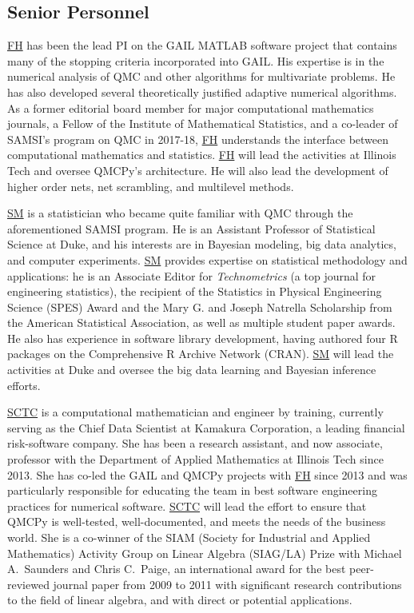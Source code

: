\documentclass[11pt]{NSFamsart}
\newcommand{\FH}{\hyperlink{FHlink}{FH}\xspace}
\newcommand{\SM}{\hyperlink{SMlink}{SM}\xspace}
\newcommand{\SCTC}{\hyperlink{SCTClink}{SCTC}\xspace}
\begin{document}
\subsection{Senior Personnel}
\FH has been the lead PI on the GAIL \cite{ChoEtal20a} MATLAB software project that contains many of the stopping criteria incorporated into GAIL.  His expertise is in the numerical analysis of QMC and other algorithms for multivariate problems.  He has also developed several theoretically justified adaptive numerical algorithms.  As a former editorial board member for major computational mathematics journals, a Fellow of the Institute of Mathematical Statistics, and a co-leader of SAMSI's program on QMC in 2017-18, \FH understands the interface between computational mathematics and statistics.  \FH will lead the activities at Illinois Tech and oversee QMCPy's architecture.  He will also lead the development of higher order nets, net scrambling, and multilevel methods.

\SM is a statistician who became quite familiar with QMC through the aforementioned SAMSI program. He is an Assistant Professor of Statistical Science at Duke, and his interests are in Bayesian modeling, big data analytics, and computer experiments. \SM provides expertise on statistical methodology and applications: he is an Associate Editor for \textit{Technometrics} (a top journal for engineering statistics), the recipient of the Statistics in Physical Engineering Science (SPES) Award and the Mary G. and Joseph Natrella Scholarship from the American Statistical Association, as well as multiple student paper awards. He also has experience in software library development, having authored four \textsc{R} packages \cite{support,minimaxdesign,cmenet,atmopt} on the Comprehensive R Archive Network (CRAN). \SM will lead the activities at Duke and oversee the big data learning and Bayesian inference efforts.

\SCTC is a computational mathematician and engineer by training, currently serving as the Chief Data Scientist at Kamakura Corporation, a leading financial risk-software company.  She has been a research assistant, and now associate, professor with the Department of Applied Mathematics at Illinois Tech since 2013.  She has co-led the GAIL and QMCPy projects with \FH  since 2013 and was particularly responsible for educating the team in best software engineering practices for numerical software.  \SCTC will lead the effort to ensure that QMCPy is well-tested, well-documented, and meets the needs of the business world. She is a co-winner of the SIAM (Society for Industrial and Applied Mathematics) Activity Group on Linear Algebra (SIAG/LA) Prize with Michael A.~Saunders and Chris C.~Paige, an international
award for the best peer-reviewed journal paper from 2009 to 2011 with significant research contributions to the field of linear algebra, and with direct or potential applications.
\end{document}
